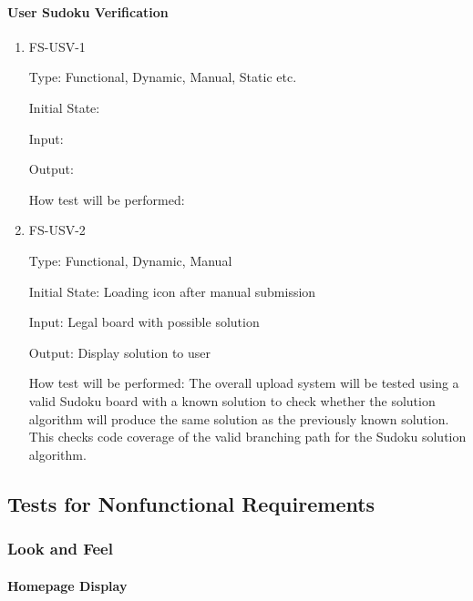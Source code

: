 \documentclass[11pt]{article}
\begin{document}
\paragraph{User Sudoku Verification}

\begin{enumerate}

\item{FS-USV-1\\}

Type: Functional, Dynamic, Manual, Static etc.
					
Initial State: 
					
Input: 
					
Output: 
					
How test will be performed: 
					
\item{FS-USV-2\\}

Type: Functional, Dynamic, Manual
					
Initial State: Loading icon after manual submission
					
Input: Legal board with possible solution
					
Output: Display solution to user
					
How test will be performed: The overall upload system will be tested using a valid Sudoku board with a known solution to check whether the solution algorithm will produce the same solution as the previously known solution. This checks code coverage of the valid branching path for the Sudoku solution algorithm.

\end{enumerate}

\subsection{Tests for Nonfunctional Requirements}

\subsubsection{Look and Feel}
		
\paragraph{Homepage Display}
\end{document}
